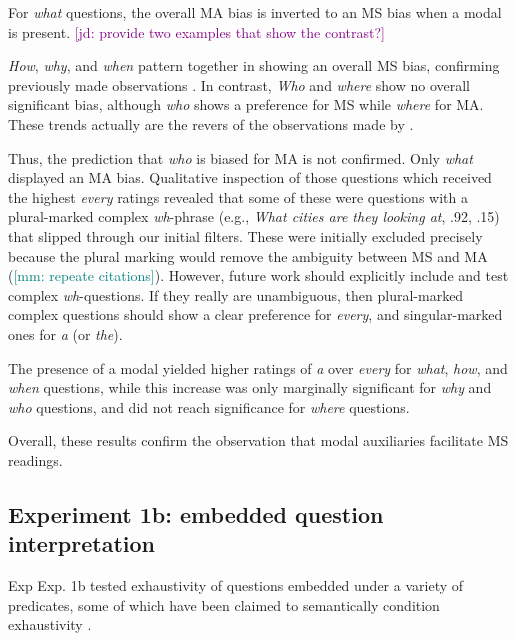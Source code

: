 \documentclass[12pt,letterpaper,table,svgnames,dvipsnames]{article}
\newcommand{\jd}[1]{\textcolor{Purple}{[jd: #1]}}
\newcommand{\mm}[1]{\textcolor{teal}{[mm: #1]}}
\newcommand{\figref}[1]{Fig.~\ref{#1}}
\begin{document}
For \emph{what} questions, the overall MA bias is inverted to an MS bias when a modal is present. \jd{provide two examples that show the contrast?}%

\emph{How}, \emph{why}, and \emph{when} pattern together in showing an overall MS bias, confirming previously made observations \cite{ginzburg1995,asherlascarides1998}. In contrast, \emph{Who} and \emph{where} show no overall significant bias, although \emph{who} shows a preference for MS while \emph{where} for MA. These trends actually are the revers of the observations made by \cite{ginzburg1995,asherlascarides1998}.

Thus, the prediction that \emph{who} is biased for MA is not confirmed. Only \emph{what} displayed an MA bias. Qualitative inspection of those questions which received the highest \emph{every} ratings revealed that some of these were questions with a plural-marked complex \emph{wh}-phrase (e.g., \emph{What cities are they looking at}, .92, .15) that slipped through our initial filters. These were initially excluded precisely because the plural marking would remove the ambiguity between MS and MA (\mm{repeate citations}).%
However, future work should explicitly include and test complex \emph{wh}-questions. If they really are unambiguous, then plural-marked complex questions should show a clear preference for \emph{every}, and singular-marked ones for \emph{a} (or \emph{the}).

The presence of a modal yielded higher ratings of \emph{a} over \emph{every} for \emph{what}, \emph{how}, and \emph{when} questions, while this increase was only marginally significant for  \emph{why} and \emph{who} questions, and did not reach significance for \emph{where} questions. 


Overall, these results confirm the observation that modal auxiliaries facilitate MS readings. 

\subsection{Experiment 1b: embedded question interpretation}
Exp
Exp. 1b tested exhaustivity of questions embedded under a variety of predicates, some of which have been claimed to semantically condition exhaustivity \cite{heim1994,klineroth2011,george2011}.
\end{document}
